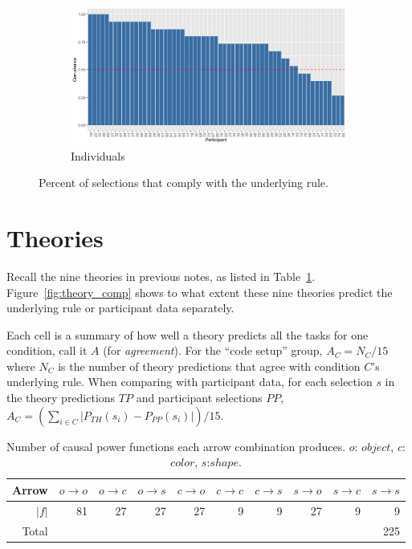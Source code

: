 \documentclass{article}
\begin{document}
\begin{figure}[h!]
  \begin{subfigure}[t]{0.9\textwidth}
    \centering
    \includegraphics[width=\linewidth]{com_ind} 
    \caption{Individuals}
  \end{subfigure}
  \caption{Percent of selections that comply with the underlying rule.}
  \label{fig:compliance}
\end{figure}

\section{Theories}

Recall the nine theories in previous notes, as listed in Table~\ref{functions}. Figure~\ref{fig:theory_comp} shows to what extent these nine theories predict the underlying rule or participant data separately.

Each cell is a summary of how well a theory predicts all the tasks for one condition, call it $A$ (for \emph{agreement}). For the ``code setup'' group, $A_C = N_C/15$ where $N_C$ is the number of theory predictions that agree with condition $C$'s underlying rule. When comparing with participant data, for each selection $s$ in the theory predictions $TP$ and participant selections $PP$, $A_C = (\sum_{i \in C}|P_{TH}(s_i) - P_{PP}(s_i)|)/15$.


\begin{table}
  \centering
  \begin{tabular}{rrrrrrrrrr}
    Arrow & $o \rightarrow o$ & $o \rightarrow c$ & $o \rightarrow s$ & $c \rightarrow o$ & $c \rightarrow c$ & $c \rightarrow s$ & $s \rightarrow o$ & $s \rightarrow c$ & $s \rightarrow s$ \\
    \hline \hline
    $|f|$ & 81  & 27  & 27  & 27  & 9   & 9   & 27  & 9   & 9   \\
    \hline
    Total &     &     &     &     &     &     &     &     & 225
  \end{tabular}
  \caption{Number of causal power functions each arrow combination produces. $o$: $object$, $c$: $color$, $s$:$shape$.}
  \label{functions}
\end{table}
\end{document}
